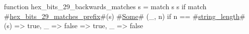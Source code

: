 function hex_bits_29_backwards_matches s = match s {
  s if match #\hyperref[sailRISCVzhexzybitszy29zymatcheszyprefix]{hex\_bits\_29\_matches\_prefix}#(s) {
    #\hyperref[sailRISCVzSome]{Some}# (_, n) if n == #\hyperref[sailRISCVzstringzylength]{string\_length}#(s) => true,
    _ => false
  } => true,
  _ => false
}
